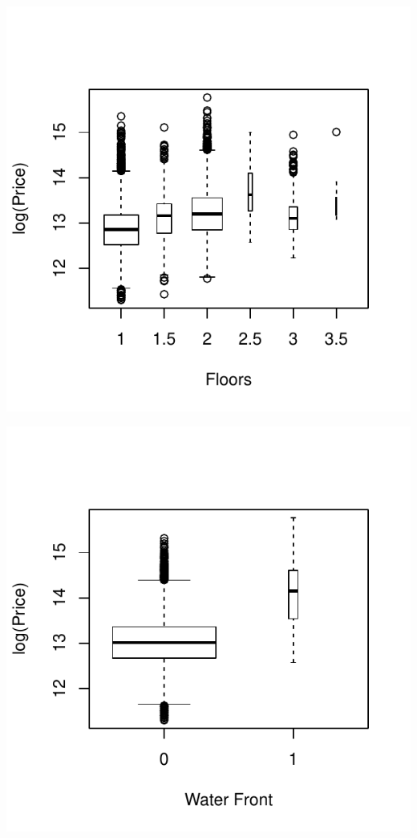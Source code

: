 \documentclass{article}\usepackage[]{graphicx}\usepackage[]{color}
\makeatletter
\def\maxwidth{ %
  \ifdim\Gin@nat@width>\linewidth
    \linewidth
  \else
    \Gin@nat@width
  \fi
}
\newenvironment{knitrout}{}{} %
\makeatother
\begin{document}
\begin{enumerate}
\begin{enumerate}
\begin{knitrout}
\color{fgcolor}
\includegraphics[width=\maxwidth]{figure/discrete-1} 

\includegraphics[width=\maxwidth]{figure/discrete-2} 


\end{knitrout}
\end{enumerate}
\end{enumerate}
\end{document}

